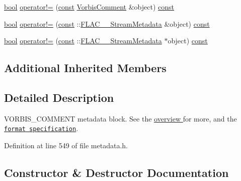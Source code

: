 {\bf }\par
\begin{DoxyCompactItemize}
\item 
\hyperlink{mac_2config_2i386_2lib-src_2libsoxr_2soxr-config_8h_abb452686968e48b67397da5f97445f5b}{bool} \hyperlink{class_f_l_a_c_1_1_metadata_1_1_vorbis_comment_a534ad61a7bf4580b786fc5ff7de1bdb7}{operator!=} (\hyperlink{getopt1_8c_a2c212835823e3c54a8ab6d95c652660e}{const} \hyperlink{class_f_l_a_c_1_1_metadata_1_1_vorbis_comment}{Vorbis\+Comment} \&object) \hyperlink{getopt1_8c_a2c212835823e3c54a8ab6d95c652660e}{const} 
\item 
\hyperlink{mac_2config_2i386_2lib-src_2libsoxr_2soxr-config_8h_abb452686968e48b67397da5f97445f5b}{bool} \hyperlink{class_f_l_a_c_1_1_metadata_1_1_vorbis_comment_a511cc194f41b48922f01632e26ec40e5}{operator!=} (\hyperlink{getopt1_8c_a2c212835823e3c54a8ab6d95c652660e}{const} \+::\hyperlink{struct_f_l_a_c_____stream_metadata}{F\+L\+A\+C\+\_\+\+\_\+\+Stream\+Metadata} \&object) \hyperlink{getopt1_8c_a2c212835823e3c54a8ab6d95c652660e}{const} 
\item 
\hyperlink{mac_2config_2i386_2lib-src_2libsoxr_2soxr-config_8h_abb452686968e48b67397da5f97445f5b}{bool} \hyperlink{class_f_l_a_c_1_1_metadata_1_1_vorbis_comment_a2774fbb6849d04439f2f7ee84c0b9723}{operator!=} (\hyperlink{getopt1_8c_a2c212835823e3c54a8ab6d95c652660e}{const} \+::\hyperlink{struct_f_l_a_c_____stream_metadata}{F\+L\+A\+C\+\_\+\+\_\+\+Stream\+Metadata} $\ast$object) \hyperlink{getopt1_8c_a2c212835823e3c54a8ab6d95c652660e}{const} 
\end{DoxyCompactItemize}

\subsection*{Additional Inherited Members}


\subsection{Detailed Description}
V\+O\+R\+B\+I\+S\+\_\+\+C\+O\+M\+M\+E\+NT metadata block. See the \hyperlink{group__flacpp__metadata__object}{overview } for more, and the \href{../format.html#metadata_block_vorbis_comment}{\tt format specification}. 

Definition at line 549 of file metadata.\+h.



\subsection{Constructor \& Destructor Documentation}
